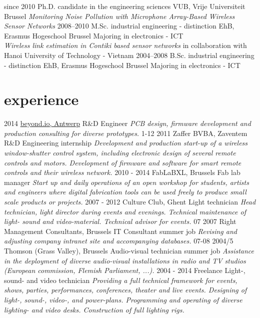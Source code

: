 \documentclass[print]{friggeri-cv}
\begin{document}
\begin{entrylist}
  \entry
    {since 2010}
    {Ph.D. {\normalfont candidate in the engineering sciences}}
    {VUB, Vrije Universiteit Brussel}
    {\emph{Monitoring Noise Pollution with Microphone Array-Based Wireless Sensor Networks}}
  \entry
    {2008–2010}
    {M.Sc. {\normalfont industrial engineering - distinction}}
    {EhB, Erasmus Hogeschool Brussel}
    {Majoring in electronics - ICT\\
    \emph{Wireless link estimation in Contiki based sensor networks} in collaboration with Hanoi University of Technology - Vietnam}
  \entry
    {2004–2008}
    {B.Sc. {\normalfont industrial engineering - distinction}}
    {EhB, Erasmus Hogeschool Brussel}
    {Majoring in electronics - ICT}
\end{entrylist}

\section{experience}

\begin{entrylist}
  \entry
    {2014}
    {\href{http://beyond.io}{beyond.io, Antwerp}}
    {R\&D Engineer}
    {\emph{PCB design, firmware development and production consulting for diverse prototypes.}}
  \entry
    {1-12 2011}
    {Zaffer BVBA, Zaventem}
    {R\&D Engineering internship}
    {\emph{Development and production start-up of a wireless window-shutter control system, including electronic design of several remote controls and motors. Development of firmware and software for smart remote controls and their wireless network.}}
  \entry
    {2010 - 2014}
    {FabLaBXL, Brussels}
    {Fab lab manager}
    {\emph{Start up and daily operations of an open workshop for students, artists and engineers where digital fabrication tools can be used freely to produce small scale products or projects.}}
  \entry
    {2007 - 2012}
    {Culture Club, Ghent}
    {Light technician}
    {\emph{Head technician, light director during events and evenings. Technical maintenance of light- sound and video-material. Technical advisor for events.}}
  \entry
    {07 2007}
    {Right Management Consultants, Brussels}
    {IT Consultant summer job}
    {\emph{Revising and adjusting company intranet site and accompanying databases.}}
  \entry
    {07-08 2004/5}
    {Thomson (Grass Valley), Brussels}
    {Audio-visual technician summer job}
    {\emph{Assistance in the deployment of diverse audio-visual installations in radio and TV studios (European commission, Flemish Parliament, ...).}}
  \entry
    {2004 - 2014}
    {Freelance}
    {Light-, sound- and video technician}
    {\emph{Providing a full technical framework for events, shows, parties, performances, conferences, theater and live events. Designing of light-, sound-, video-, and power-plans. Programming and operating of diverse lighting- and video desks. Construction of full lighting rigs.}}
\end{entrylist}
\end{document}
